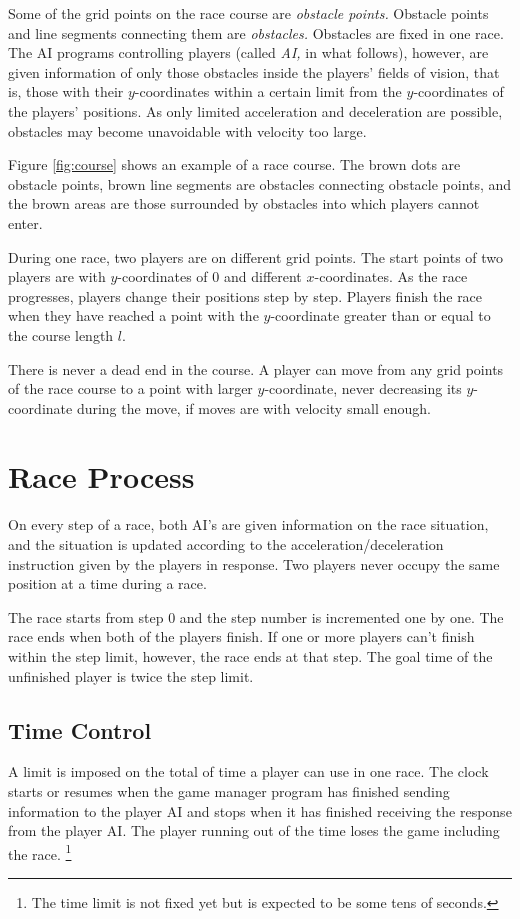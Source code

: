 \documentclass[11pt]{article}
\begin{document}
Some of the grid points on the race course are {\em obstacle points.}
Obstacle points and line segments connecting them are {\em obstacles.}
Obstacles are fixed in one race.  The AI programs controlling players
(called {\em AI,} in what follows), however, are given information of
only those obstacles inside the players' fields of vision, that is,
those with their $y$-coordinates within a certain limit from the
$y$-coordinates of the players' positions.  As only limited
acceleration and deceleration are possible, obstacles may become
unavoidable with velocity too large.

Figure \ref{fig:course} shows an example of a race course.  The brown
dots are obstacle points, brown line segments are obstacles connecting
obstacle points, and the brown areas are those surrounded by obstacles
into which players cannot enter.

During one race, two players are on different grid points.  The start
points of two players are with $y$-coordinates of $0$ and different
$x$-coordinates.  As the race progresses, players change their
positions step by step.  Players finish the race when they have reached
a point with the $y$-coordinate greater than or equal to the course
length $l$.

There is never a dead end in the course.  A player can move from any
grid points of the race course to a point with larger $y$-coordinate,
never decreasing its $y$-coordinate during the move, if moves are with
velocity small enough.

\section{Race Process}
On every step of a race, both AI's are given information on the race
situation, and the situation is updated according to the
acceleration/deceleration instruction given by the players in
response.  Two players never occupy the same position at a time during
a race.

The race starts from step 0 and the step number is incremented one by
one.  The race ends when both of the players finish.  If one or more
players can't finish within the step limit, however, the race ends at
that step.  The goal time of the unfinished player is twice the step
limit.

\subsection{Time Control}
A limit is imposed on the total of time a player can use in one race.
The clock starts or resumes when the game manager program has finished
sending information to the player AI and stops when it has finished
receiving the response from the player AI.  The player running out of
the time loses the game including the race.
\footnote{The time limit is not fixed yet but is expected to be some
  tens of seconds.}
\end{document}
